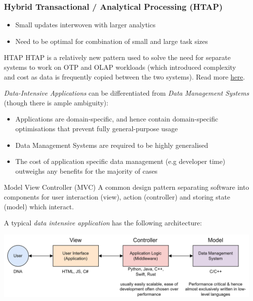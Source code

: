 \subsubsection{Hybrid Transactional / Analytical Processing (HTAP)}
\begin{itemize}
    \item Small updates interwoven with larger analytics
    \item Need to be optimal for combination of small and large task sizes
\end{itemize}

\begin{sidenotebox}{HTAP}
    HTAP is a relatively new pattern used to solve the need for separate systems to work on OTP and OLAP workloads (which introduced complexity and cost as data is frequently copied between the two systems). Read more \href{https://en.wikipedia.org/wiki/Hybrid_transactional/analytical_processing}{here}.
\end{sidenotebox}
\noindent
\textit{Data-Intensive Applications} can be differentiated from \textit{Data Management Systems} (though there is ample ambiguity):
\begin{itemize}
    \item Applications are domain-specific, and hence contain domain-specific optimisations that prevent fully general-purpose usage
    \item Data Management Systems are required to be highly generalised
    \item The cost of application specific data management (e.g developer time) outweighs any benefits for the majority of cases
\end{itemize}

\begin{definitionbox}{Model View Controller (MVC)}
    A common design pattern separating software into components for user interaction (view), action (controller) and storing state (model) which interact.
\end{definitionbox}

A typical \textit{data intensive application} has the following architecture:
\begin{center}
    \includegraphics[width=.9\textwidth]{introduction/images/application_architecture.drawio.png}
\end{center}

